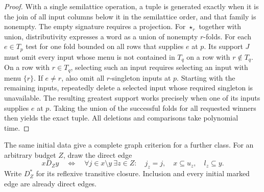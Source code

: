 \begin{proof}
With a single semilattice operation, a tuple is generated exactly when
it is the join of all input columns below it in the semilattice order,
and that family is nonempty. The empty signature requires a projection.
For $\star_r$ together with union, distributivity expresses a word as
a union of nonempty $r$-folds. For each $e\in T_p$ test for one fold
bounded on all rows that supplies $e$ at $p$. Its support $J$ must omit
every input whose menu is not contained in $T_q$ on a
row with $r\notin T_q$. On a row with $r\in T_q$, selecting such an
input requires selecting an input with menu $\{r\}$. If $e\ne r$,
also omit all $r$-singleton inputs at $p$. Starting with the remaining
inputs, repeatedly delete a selected input whose required singleton
is unavailable. The resulting greatest support works precisely when
one of its inputs supplies $e$ at $p$. Taking the union of the
successful folds for all requested winners then yields the exact tuple.
All deletions and comparisons take polynomial time.
\end{proof}

The same initial data give a complete graph criterion for a further class.
For an arbitrary budget $Z$, draw the direct edge
\begin{equation}\label{core:eq:direct-marked-edge}
 xD_Zy\quad\Longleftrightarrow\quad
 \forall j\in x\setminus y\ \exists z\in Z:\quad
 j_z=j,\quad x\subseteq u_z,\quad l_z\subseteq y.
\end{equation}
Write $D_Z^*$ for its reflexive transitive closure. Inclusion and every
initial marked edge are already direct edges.

